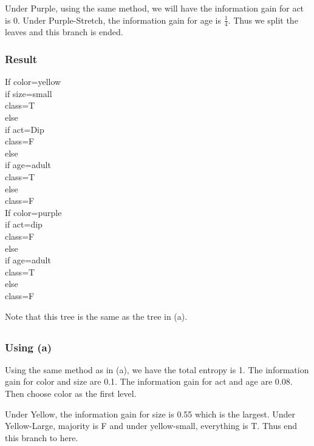 \noindent Under Purple, using the same method, we will have the information gain for act is 0. Under Purple-Stretch, the information gain for age is $\frac{1}{4}$. Thus we split the leaves and this branch is ended.
\subsubsection{Result}
If color=yellow
\\ \indent if size=small
\\ \indent \indent class=T
\\ \indent else 
\\ \indent \indent if act=Dip
\\ \indent \indent \indent class=F
\\ \indent \indent else 
\\ \indent \indent \indent if age=adult
\\ \indent \indent \indent \indent class=T
\\ \indent \indent \indent else
\\ \indent \indent \indent \indent class=F  
\\ \noindent If color=purple
\\ \indent if act=dip
\\ \indent \indent class=F
\\ \indent else 
\\ \indent \indent if age=adult
\\ \indent \indent \indent class=T
\\ \indent \indent else 
\\ \indent \indent \indent class=F 

\noindent Note that this tree is the same as the tree in (a).
\subsection{}
\subsubsection{Using (a)}
\noindent Using the same method as in (a), we have the total entropy is 1. The information gain for color and size are 0.1. The information gain for act and age are 0.08. Then choose color as the first level.

\noindent Under Yellow, the information gain for size is 0.55 which is the largest. Under Yellow-Large, majority is F and under yellow-small, everything is T. Thus end this branch to here. 

